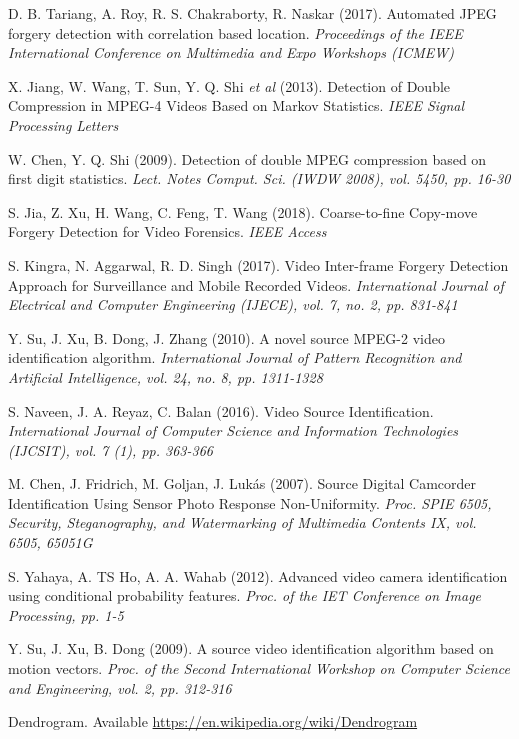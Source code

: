 \begin{thebibliography}{11}
D. B. Tariang, A. Roy, R. S. Chakraborty, R. Naskar (2017). Automated JPEG forgery detection with correlation based location. \textit{Proceedings of the IEEE International Conference on Multimedia and Expo Workshops (ICMEW)}

X. Jiang, W. Wang, T. Sun, Y. Q. Shi \textit{et al} (2013). Detection of Double Compression in MPEG-4 Videos Based on Markov Statistics. \textit{IEEE Signal Processing Letters}

W. Chen, Y. Q. Shi (2009). Detection of double MPEG compression based on first digit statistics. \textit{Lect. Notes Comput. Sci. (IWDW 2008), vol. 5450, pp. 16-30}

S. Jia, Z. Xu, H. Wang, C. Feng, T. Wang (2018). Coarse-to-fine Copy-move Forgery Detection for Video Forensics. \textit{IEEE Access}

S. Kingra, N. Aggarwal, R. D. Singh (2017). Video Inter-frame Forgery Detection Approach for Surveillance and Mobile Recorded Videos. \textit{International Journal of Electrical and Computer Engineering (IJECE), vol. 7, no. 2, pp. 831-841}

Y. Su, J. Xu, B. Dong, J. Zhang (2010). A novel source MPEG-2 video identification algorithm. \textit{International Journal of Pattern Recognition and Artificial Intelligence, vol. 24, no. 8, pp. 1311-1328}

S. Naveen, J. A. Reyaz, C. Balan (2016). Video Source Identification. \textit{International Journal of Computer Science and Information Technologies (IJCSIT), vol. 7 (1), pp. 363-366}

M. Chen, J. Fridrich, M. Goljan, J. Lukás (2007). Source Digital Camcorder Identification Using Sensor Photo Response Non-Uniformity. \textit{Proc. SPIE 6505, Security, Steganography, and Watermarking of Multimedia Contents IX, vol. 6505, 65051G}

S. Yahaya, A. TS Ho, A. A. Wahab (2012). Advanced video camera identification using conditional probability features. \textit{Proc. of the IET Conference on Image Processing, pp. 1-5}

Y. Su, J. Xu, B. Dong (2009). A source video identification algorithm based on motion vectors. \textit{Proc. of the Second International Workshop on Computer Science and Engineering, vol. 2, pp. 312-316}

Dendrogram. Available \url{https://en.wikipedia.org/wiki/Dendrogram}


\end{thebibliography}
